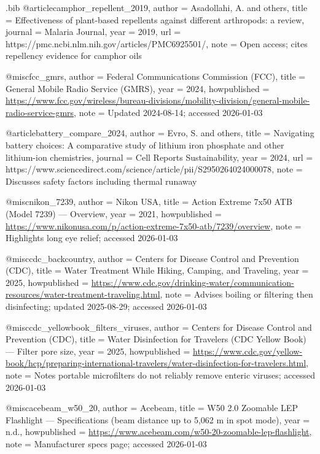 \begin{filecontents*}{\jobname.bib}
@article{camphor_repellent_2019,
  author  = {Asadollahi, A. and others},
  title   = {Effectiveness of plant-based repellents against different arthropods: a review},
  journal = {Malaria Journal},
  year    = {2019},
  url     = {https://pmc.ncbi.nlm.nih.gov/articles/PMC6925501/},
  note    = {Open access; cites repellency evidence for camphor oils}
}

@misc{fcc_gmrs,
  author       = {{Federal Communications Commission (FCC)}},
  title        = {General Mobile Radio Service (GMRS)},
  year         = {2024},
  howpublished = {\url{https://www.fcc.gov/wireless/bureau-divisions/mobility-division/general-mobile-radio-service-gmrs}},
  note         = {Updated 2024-08-14; accessed 2026-01-03}
}

@article{battery_compare_2024,
  author  = {Evro, S. and others},
  title   = {Navigating battery choices: A comparative study of lithium iron phosphate and other lithium-ion chemistries},
  journal = {Cell Reports Sustainability},
  year    = {2024},
  url     = {https://www.sciencedirect.com/science/article/pii/S2950264024000078},
  note    = {Discusses safety factors including thermal runaway}
}

@misc{nikon_7239,
  author       = {{Nikon USA}},
  title        = {Action Extreme 7x50 ATB (Model 7239) --- Overview},
  year         = {2021},
  howpublished = {\url{https://www.nikonusa.com/p/action-extreme-7x50-atb/7239/overview}},
  note         = {Highlights long eye relief; accessed 2026-01-03}
}

@misc{cdc_backcountry,
  author       = {{Centers for Disease Control and Prevention (CDC)}},
  title        = {Water Treatment While Hiking, Camping, and Traveling},
  year         = {2025},
  howpublished = {\url{https://www.cdc.gov/drinking-water/communication-resources/water-treatment-traveling.html}},
  note         = {Advises boiling or filtering then disinfecting; updated 2025-08-29; accessed 2026-01-03}
}

@misc{cdc_yellowbook_filters_viruses,
  author       = {{Centers for Disease Control and Prevention (CDC)}},
  title        = {Water Disinfection for Travelers (CDC Yellow Book) --- Filter pore size},
  year         = {2025},
  howpublished = {\url{https://www.cdc.gov/yellow-book/hcp/preparing-international-travelers/water-disinfection-for-travelers.html}},
  note         = {Notes portable microfilters do not reliably remove enteric viruses; accessed 2026-01-03}
}

@misc{acebeam_w50_20,
  author       = {{Acebeam}},
  title        = {W50 2.0 Zoomable LEP Flashlight --- Specifications (beam distance up to 5,062 m in spot mode)},
  year         = {n.d.},
  howpublished = {\url{https://www.acebeam.com/w50-20-zoomable-lep-flashlight}},
  note         = {Manufacturer specs page; accessed 2026-01-03}
}




\end{filecontents*}
